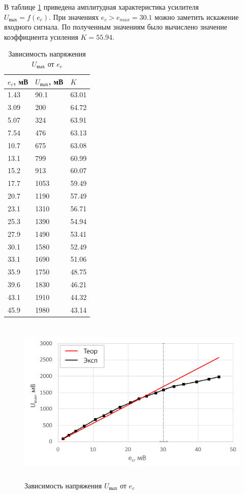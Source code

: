 В таблице \ref{tabular:2} приведена амплитудная характеристика усилителя\\ $U_\text{вых} = f(e_c)$. При значениях $e_c > e_{max} = 30.1$ можно заметить искажение входного сигнала. По полученным значениям было вычислено значение коэффициента усиления $K = 55.94$.

\begin{table}[H]
	\begin{center}
	\caption{Зависимость напряжения $U_\text{вых}$ от $e_c$}
	\def\arraystretch{1.2}
		\begin{tabularx}{\textwidth}{|X|X|X|}
			\hline
			$e_c$, мВ & $U_\text{вых}$, мВ & $K$ \\\hline			
			1.43 & 90.1 & 63.01\\\hline	
			3.09 & 200 & 64.72\\\hline	
			5.07 & 324 & 63.91\\\hline	
			7.54 & 476 & 63.13\\\hline	
			10.7 & 675 & 63.08\\\hline	
			13.1 & 799 & 60.99\\\hline	
			15.2 & 913 & 60.07\\\hline	
			17.7 & 1053 & 59.49\\\hline	
			20.7 & 1190 & 57.49\\\hline	
			23.1 & 1310 & 56.71\\\hline	
			25.3 & 1390 & 54.94\\\hline	
			27.9 & 1490 & 53.41\\\hline	
			30.1 & 1580 & 52.49\\\hline\hline
			33.1 & 1690 & 51.06\\\hline	
			35.9 & 1750 & 48.75\\\hline	
			39.6 & 1830 & 46.21\\\hline	
			43.1 & 1910 & 44.32\\\hline	
			45.9 & 1980 & 43.14\\\hline
		\end{tabularx}
		\label{tabular:2}
	\end{center}
\end{table}

\begin{figure}[H]
	\begin{center}
		\includegraphics[height=8cm]{img/1}
		\caption{Зависимость напряжения $U_\text{вых}$ от $e_c$}
		\label{figure:2}
	\end{center}
\end{figure}

